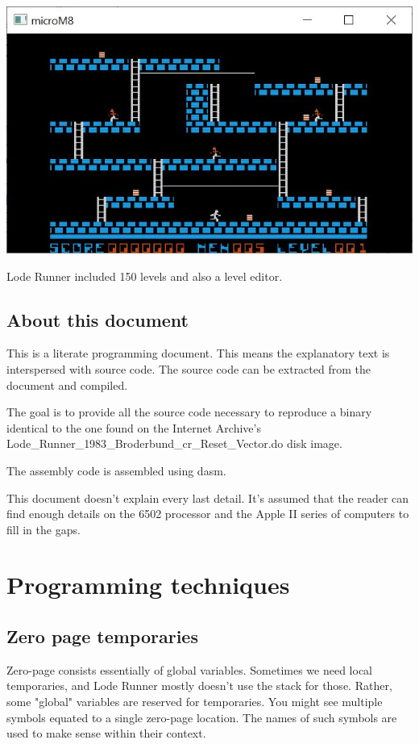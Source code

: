 \documentclass[10pt]{report}%
\begin{document}
\begin{center}
\includegraphics[width=\columnwidth]{screen}
\end{center}

Lode Runner included 150 levels and also a level editor.

\section{About this document}

This is a literate programming document. This means the explanatory text is
interspersed with source code. The source code can be extracted from the document
and compiled.

The goal is to provide all the source code necessary to reproduce a binary
identical to the one found on the Internet Archive's {\Tt{}Lode{\_}Runner{\_}1983{\_}Broderbund{\_}cr{\_}Reset{\_}Vector.do\nwendquote}
disk image.

The assembly code is assembled using {\Tt{}dasm\nwendquote}.

This document doesn't explain every last detail. It's assumed that the reader can
find enough details on the 6502 processor and the Apple II series of computers
to fill in the gaps.

\chapter{Programming techniques}

\section{Zero page temporaries}

Zero-page consists essentially of global variables. Sometimes we need local
temporaries, and Lode Runner mostly doesn't use the stack for those. Rather,
some "global" variables are reserved for temporaries. You might see multiple
symbols equated to a single zero-page location. The names of such symbols are
used to make sense within their context.
\end{document}
